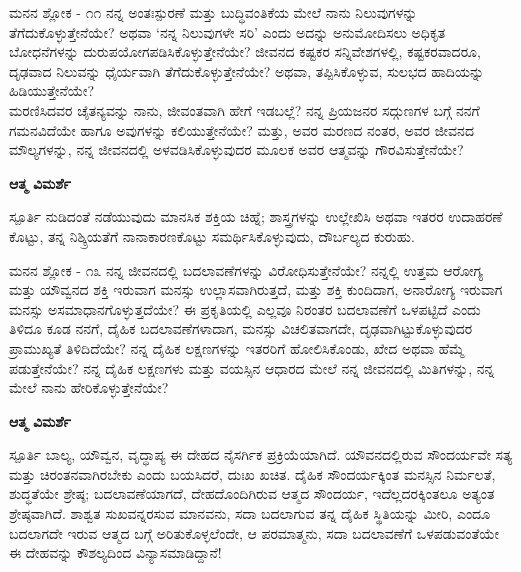 \newpage
\begin{mananam}{\mananamfont ಮನನ ಶ್ಲೋಕ - ೧೧}
\small \mananatext ನನ್ನ ಅಂತಃಸ್ಪುರಣೆ ಮತ್ತು ಬುದ್ಧಿವಂತಿಕೆಯ ಮೇಲೆ ನಾನು ನಿಲುವುಗಳನ್ನು ತೆಗೆದುಕೊಳ್ಳುತ್ತೇನೆಯೇ? ಅಥವಾ ‘ನನ್ನ ನಿಲುವುಗಳೇ ಸರಿ’ ಎಂದು ಅದನ್ನು ಅನುಮೋದಿಸಲು ಅಧಿಕೃತ ಬೋಧನೆಗಳನ್ನು ದುರುಪಯೋಗಪಡಿಸಿಕೊಳ್ಳುತ್ತೇನೆಯೇ? ಜೀವನದ ಕಷ್ಟಕರ ಸನ್ನಿವೇಶಗಳಲ್ಲಿ, ಕಷ್ಟಕರವಾದರೂ, ದೃಢವಾದ ನಿಲುವನ್ನು ಧೈರ್ಯವಾಗಿ ತೆಗೆದುಕೊಳ್ಳುತ್ತೇನೆಯೇ? ಅಥವಾ, ತಪ್ಪಿಸಿಕೊಳ್ಳುವ, ಸುಲಭದ ಹಾದಿಯನ್ನು ಹಿಡಿಯುತ್ತೇನೆಯೇ?\\
ಮರಣಿಸಿದವರ ಚೈತನ್ಯವನ್ನು ನಾನು, ಜೀವಂತವಾಗಿ ಹೇಗೆ ಇಡಬಲ್ಲೆ? ನನ್ನ ಪ್ರಿಯಜನರ ಸದ್ಗುಣಗಳ ಬಗ್ಗೆ ನನಗೆ ಗಮನವಿದೆಯೇ ಹಾಗೂ ಅವುಗಳನ್ನು ಕಲಿಯುತ್ತೇನೆಯೇ? ಮತ್ತು, ಅವರ ಮರಣದ ನಂತರ, ಅವರ ಜೀವನದ ಮೌಲ್ಯಗಳನ್ನು, ನನ್ನ ಜೀವನದಲ್ಲಿ ಅಳವಡಿಸಿಕೊಳ್ಳುವುದರ ಮೂಲಕ ಅವರ ಆತ್ಮವನ್ನು ಗೌರವಿಸುತ್ತೇನೆಯೇ?
\end{mananam}
\WritingHand\enspace\textbf{ಆತ್ಮ ವಿಮರ್ಶೆ}
\begin{inspiration}{\mananamfont ಸ್ಪೂರ್ತಿ}
\small \mananatext ನುಡಿದಂತೆ ನಡೆಯುವುದು ಮಾನಸಿಕ ಶಕ್ತಿಯ ಚಿಹ್ನೆ; ಶಾಸ್ತ್ರಗಳನ್ನು ಉಲ್ಲೇಖಿಸಿ ಅಥವಾ ಇತರರ ಉದಾಹರಣೆ ಕೊಟ್ಟು, ತನ್ನ ನಿಶ್ಕ್ರಿಯತೆಗೆ ನಾನಾಕಾರಣಕೊಟ್ಟು ಸಮರ್ಥಿಸಿಕೊಳ್ಳುವುದು, ದೌರ್ಬಲ್ಯದ ಕುರುಹು.
\end{inspiration}
\newpage

\begin{mananam}{\mananamfont ಮನನ ಶ್ಲೋಕ - ೧೩}
\small \mananatext ನನ್ನ ಜೀವನದಲ್ಲಿ ಬದಲಾವಣೆಗಳನ್ನು ವಿರೋಧಿಸುತ್ತೇನೆಯೇ? ನನ್ನಲ್ಲಿ ಉತ್ತಮ ಆರೋಗ್ಯ ಮತ್ತು ಯೌವ್ವನದ ಶಕ್ತಿ ಇರುವಾಗ ಮನಸ್ಸು ಉಲ್ಲಾಸವಾಗಿರುತ್ತದೆ, ಮತ್ತು ಶಕ್ತಿ ಕುಂದಿದಾಗ, ಅನಾರೋಗ್ಯ ಇರುವಾಗ ಮನಸ್ಸು ಅಸಮಾಧಾನಗೊಳ್ಳುತ್ತದೆಯೇ? ಈ ಪ್ರಕೃತಿಯಲ್ಲಿ ಎಲ್ಲವೂ ನಿರಂತರ ಬದಲಾವಣೆಗೆ ಒಳಪಟ್ಟಿದೆ ಎಂದು ತಿಳಿದೂ ಕೂಡ ನನಗೆ, ದೈಹಿಕ ಬದಲಾವಣೆಗಳಾದಾಗ, ಮನಸ್ಸು ವಿಚಲಿತವಾಗದೇ, ದೃಢವಾಗಿಟ್ಟುಕೊಳ್ಳುವುದರ ಪ್ರಾಮುಖ್ಯತೆ ತಿಳಿದಿದೆಯೇ? ನನ್ನ ದೈಹಿಕ ಲಕ್ಷಣಗಳನ್ನು ಇತರರಿಗೆ ಹೋಲಿಸಿಕೊಂಡು, ಖೇದ ಅಥವಾ ಹೆಮ್ಮೆ ಪಡುತ್ತೇನೆಯೇ? ನನ್ನ ದೈಹಿಕ ಲಕ್ಷಣಗಳು ಮತ್ತು ವಯಸ್ಸಿನ ಆಧಾರದ ಮೇಲೆ ನನ್ನ ಜೀವನದಲ್ಲಿ ಮಿತಿಗಳನ್ನು, ನನ್ನ ಮೇಲೆ ನಾನು ಹೇರಿಕೊಳ್ಳುತ್ತೇನೆಯೇ?
\end{mananam}
\WritingHand\enspace\textbf{ಆತ್ಮ ವಿಮರ್ಶೆ}
\begin{inspiration}{\mananamfont ಸ್ಪೂರ್ತಿ}
\small \mananatext ಬಾಲ್ಯ, ಯೌವ್ವನ, ವೃದ್ಧಾಪ್ಯ ಈ ದೇಹದ ನೈಸರ್ಗಿಕ ಪ್ರಕ್ರಿಯೆಯಾಗಿದೆ. ಯೌವನದಲ್ಲಿರುವ ಸೌಂದರ್ಯವೇ ಸತ್ಯ ಮತ್ತು ಚಿರಂತನವಾಗಿರಬೇಕು ಎಂದು ಬಯಸಿದರೆ, ದುಃಖ ಖಚಿತ. ದೈಹಿಕ ಸೌಂದರ್ಯಕ್ಕಿಂತ ಮನಸ್ಸಿನ ನಿರ್ಮಲತೆ, ಶುದ್ಧತೆಯೇ ಶ್ರೇಷ್ಠ; ಬದಲಾವಣೆಯಾಗದೆ, ದೇಹದೊಂದಿಗಿರುವ ಆತ್ಮದ ಸೌಂದರ್ಯ, ಇದೆಲ್ಲದರಕ್ಕಿಂತಲೂ  ಅತ್ಯಂತ ಶ್ರೇಷ್ಠವಾಗಿದೆ.
 ಶಾಶ್ವತ ಸುಖವನ್ನರಸುವ ಮಾನವನು,  ಸದಾ ಬದಲಾಗುವ ತನ್ನ ದೈಹಿಕ ಸ್ಥಿತಿಯನ್ನು ಮೀರಿ, ಎಂದೂ ಬದಲಾಗದೇ ಇರುವ ಆತ್ಮದ ಬಗ್ಗೆ ಅರಿತುಕೊಳ್ಳಲೆಂದೇ, ಆ ಪರಮಾತ್ಮನು,  ಸದಾ ಬದಲಾವಣೆಗೆ ಒಳಪಡುವಂತೆಯೇ ಈ ದೇಹವನ್ನು ಕೌಶಲ್ಯದಿಂದ ವಿನ್ಯಾಸಮಾಡಿದ್ದಾನೆ!
\end{inspiration}
\newpage

